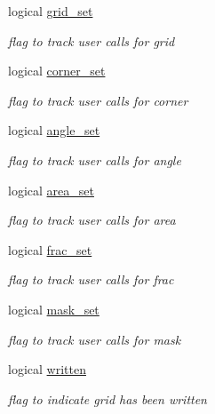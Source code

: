 \begin{DoxyCompactItemize}
logical \hyperlink{structmod__oasis__grid_1_1prism__grid__type_a41b62a294b04765a04f6f0d70c261df7}{grid\+\_\+set}
\begin{DoxyCompactList}\small\item\em flag to track user calls for grid \end{DoxyCompactList}\item 
logical \hyperlink{structmod__oasis__grid_1_1prism__grid__type_a852b381de47913b96e3fa28ade472579}{corner\+\_\+set}
\begin{DoxyCompactList}\small\item\em flag to track user calls for corner \end{DoxyCompactList}\item 
logical \hyperlink{structmod__oasis__grid_1_1prism__grid__type_a4a357fd1eb4b19d1beea5968dd783882}{angle\+\_\+set}
\begin{DoxyCompactList}\small\item\em flag to track user calls for angle \end{DoxyCompactList}\item 
logical \hyperlink{structmod__oasis__grid_1_1prism__grid__type_a369c091ef9af0281c5b4f92390f4265f}{area\+\_\+set}
\begin{DoxyCompactList}\small\item\em flag to track user calls for area \end{DoxyCompactList}\item 
logical \hyperlink{structmod__oasis__grid_1_1prism__grid__type_a427bc608d8a2123c973bee9abe8fde09}{frac\+\_\+set}
\begin{DoxyCompactList}\small\item\em flag to track user calls for frac \end{DoxyCompactList}\item 
logical \hyperlink{structmod__oasis__grid_1_1prism__grid__type_ae44525ecb0b2dfe8d4a4a8cf4abd4e1f}{mask\+\_\+set}
\begin{DoxyCompactList}\small\item\em flag to track user calls for mask \end{DoxyCompactList}\item 
logical \hyperlink{structmod__oasis__grid_1_1prism__grid__type_a48d243ede1b306ac35bb9bbeff48785a}{written}
\begin{DoxyCompactList}\small\item\em flag to indicate grid has been written \end{DoxyCompactList}\item 

\end{DoxyCompactItemize}
